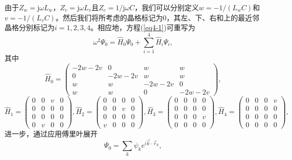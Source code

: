 由于$Z_w = \mathrm{j}\omega L_w$，$Z_v = \mathrm{j}\omega L_v$且$Z_c = 1/\mathrm{j}\omega C$，我们可以分别定义$w = -1/(L_wC)$和$v = -1/(L_vC)$。然后我们将所考虑的晶格标记为0，其左、下、右和上的最近邻晶格分别标记为$i = 1,2,3,4$。相应地，方程(\ref{eq4-1})可重写为
\begin{equation}\label{eq4-2}
    \omega^2\Psi_0 = \hat{H}_0\Psi_0 + \sum_{i = 1}^{4} \hat{H}_i\Psi_i, 
\end{equation}
其中
\begin{equation}\label{eq4-3}
    \hat{H}_0 = 
    \begin{pmatrix}
    -2w - 2v & 0 & w & w \\
    0 & -2w - 2v & w & w \\
    w & w & -2w - 2v & 0 \\
    w & w & 0 & -2w - 2v
    \end{pmatrix}, 
\end{equation}
\begin{equation}\label{eq4-4}
    \hat{H}_1 = 
    \begin{pmatrix}
    0 & 0 & v & 0 \\
    0 & 0 & 0 & 0 \\
    0 & 0 & 0 & 0 \\
    0 & v & 0 & 0
    \end{pmatrix},
    \hat{H}_2 = 
    \begin{pmatrix}
    0 & 0 & 0 & 0 \\
    0 & 0 & v & 0 \\
    0 & 0 & 0 & 0 \\
    v & 0 & 0 & 0
    \end{pmatrix},
    \hat{H}_3 = 
    \begin{pmatrix}
    0 & 0 & 0 & 0 \\
    0 & 0 & 0 & 0 \\
    0 & 0 & 0 & v \\
    0 & 0 & 0 & 0
    \end{pmatrix},
    \hat{H}_4 = 
    \begin{pmatrix}
    0 & 0 & 0 & v \\
    0 & 0 & 0 & 0 \\
    0 & 0 & 0 & 0 \\
    0 & 0 & 0 & 0
    \end{pmatrix}, 
\end{equation}
进一步，通过应用傅里叶展开
\begin{equation}\label{eq4-5}
    \Psi_0 = \sum_{k} \psi_k e^{i\vec{k} \cdot \vec{r}_0},
\end{equation}
